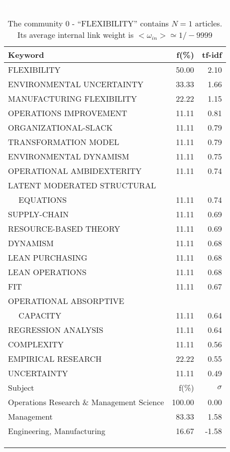 \documentclass[a4paper,11pt]{report}
\begin{document}
\begin{landscape}
\clearpage

\begin{table}[!ht]
\caption{The community 0 - ``FLEXIBILITY'' contains $N = 1$ articles. Its average internal link weight is $<\omega_{in}> \simeq 1/-9999$ }
\textcolor{white}{aa}\\
{\scriptsize\begin{tabular}{|l r  r|}
\hline
Keyword & f(\%) & tf-idf \\
\hline
FLEXIBILITY & 50.00 & 2.10\\
ENVIRONMENTAL UNCERTAINTY & 33.33 & 1.66\\
MANUFACTURING FLEXIBILITY & 22.22 & 1.15\\
OPERATIONS IMPROVEMENT & 11.11 & 0.81\\
ORGANIZATIONAL-SLACK & 11.11 & 0.79\\
TRANSFORMATION MODEL & 11.11 & 0.79\\
ENVIRONMENTAL DYNAMISM & 11.11 & 0.75\\
OPERATIONAL AMBIDEXTERITY & 11.11 & 0.74\\
LATENT MODERATED STRUCTURAL &  &\\
$\quad$ EQUATIONS & 11.11 & 0.74\\
SUPPLY-CHAIN & 11.11 & 0.69\\
RESOURCE-BASED THEORY & 11.11 & 0.69\\
DYNAMISM & 11.11 & 0.68\\
LEAN PURCHASING & 11.11 & 0.68\\
LEAN OPERATIONS & 11.11 & 0.68\\
FIT & 11.11 & 0.67\\
OPERATIONAL ABSORPTIVE &  &\\
$\quad$ CAPACITY & 11.11 & 0.64\\
REGRESSION ANALYSIS & 11.11 & 0.64\\
COMPLEXITY & 11.11 & 0.56\\
EMPIRICAL RESEARCH & 22.22 & 0.55\\
UNCERTAINTY & 11.11 & 0.49\\
\hline
\hline
Subject & f(\%) & $\sigma$\\
\hline
Operations Research \& Management Science & 100.00 & 0.00\\
Management & 83.33 & 1.58\\
Engineering, Manufacturing & 16.67 & -1.58\\
 &  & \\
 &  & \\
 &  & \\

\end{tabular}}
\end{table}
\end{landscape}
\end{document}
